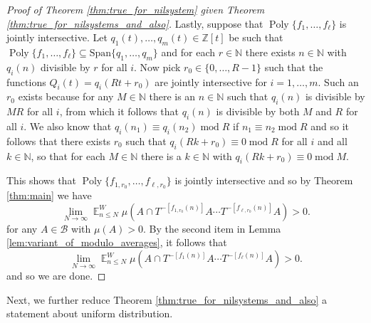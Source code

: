 \documentclass[12pt]{article}
\theoremstyle{plain} %
\theoremstyle{definition} %
\theoremstyle{plain}
\theoremstyle{plain}
\numberwithin{equation}{section}
\newcommand{\N}{\mathbb{N}}
\newcommand{\Z}{\mathbb{Z}}
\renewcommand{\leq}{\leqslant}
\renewcommand{\subset}{\subseteq}
\newcommand{\1}{\mathbbm{1}}
\newcommand{\E}{\operatorname{\mathbb{E}}}
\newcommand{\Poly}{\operatorname{Poly}}
\newcommand{\oo}{\infty}
\newcommand{\round}[1]{[ #1 ]}
\renewcommand{\mod}{\operatorname{mod}}
\begin{document}
\begin{proof}[Proof of Theorem \ref{thm:true_for_nilsystem} given Theorem \ref{thm:true_for_nilsystems_and_also}]
Lastly, suppose that $\Poly\{f_1,\dots, f_{\ell}\}$ is jointly intersective. Let $q_1(t),\dots, q_{m}(t)\in \Z[t]$ be such that $\Poly\{f_1,\dots, f_{\ell}\}\subset \text{Span}\{q_1,\dots, q_{m}\}$ and for each $r\in \N$ there exists $n\in \N$ with $q_i(n)$ divisible by $r$ for all $i$. Now pick $r_0\in \{0,\dots, R-1\}$ such that the functions $Q_{i}(t) = q_i(Rt+r_0)$ are jointly intersective for $i=1,\dots, m$. Such an $r_0$ exists because for any $M\in \N$ there is an $n\in \N$ such that $q_i(n)$ is divisible by $MR$ for all $i$, from which it follows that $q_i(n)$ is divisible by both $M$ and $R$ for all $i$. We also know that $q_i(n_1)\equiv q_i(n_2)\mod R$ if $n_1\equiv n_2\mod R$ and so it follows that there exists $r_0$ such that $q_i(Rk+r_0)\equiv 0\mod R$ for all $i$ and all $k\in \N$, so that for each $M\in \N$ there is a $k\in \N$ with $q_i(Rk+r_0)\equiv 0\mod M$. 


This shows that $\Poly\{f_{1,r_0},\dots, f_{\ell,r_0}\}$ is jointly intersective and so by Theorem \ref{thm:main} we have
\begin{equation*}             \lim_{N\to\oo}\E_{n\leq N}^W\mu(A\cap T^{-\round{f_{1,r_0}(n)}}A\cdots T^{-\round{f_{\ell,r_0}(n)}}A) >0.
\end{equation*}
for any $A\in \mathscr{B}$ with $\mu(A)>0$. By the second item in Lemma \ref{lem:variant_of_modulo_averages}, it follows that
\begin{equation*}             \lim_{N\to\oo}\E_{n\leq N}^W\mu(A\cap T^{-\round{f_{1}(n)}}A\cdots T^{-\round{f_{\ell}(n)}}A) >0.
\end{equation*}
and so we are done.
\end{proof}


Next, we further reduce Theorem \ref{thm:true_for_nilsystems_and_also} a statement about uniform distribution.
\end{document}
